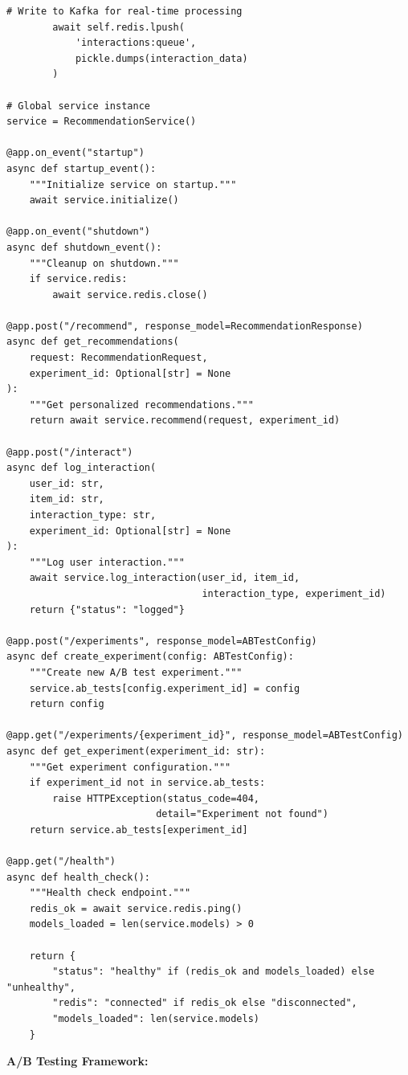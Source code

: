 \begin{lstlisting}[style=python, caption=FastAPI Serving with A/B Testing]
        # Write to Kafka for real-time processing
        await self.redis.lpush(
            'interactions:queue',
            pickle.dumps(interaction_data)
        )

# Global service instance
service = RecommendationService()

@app.on_event("startup")
async def startup_event():
    """Initialize service on startup."""
    await service.initialize()

@app.on_event("shutdown")
async def shutdown_event():
    """Cleanup on shutdown."""
    if service.redis:
        await service.redis.close()

@app.post("/recommend", response_model=RecommendationResponse)
async def get_recommendations(
    request: RecommendationRequest,
    experiment_id: Optional[str] = None
):
    """Get personalized recommendations."""
    return await service.recommend(request, experiment_id)

@app.post("/interact")
async def log_interaction(
    user_id: str,
    item_id: str,
    interaction_type: str,
    experiment_id: Optional[str] = None
):
    """Log user interaction."""
    await service.log_interaction(user_id, item_id,
                                  interaction_type, experiment_id)
    return {"status": "logged"}

@app.post("/experiments", response_model=ABTestConfig)
async def create_experiment(config: ABTestConfig):
    """Create new A/B test experiment."""
    service.ab_tests[config.experiment_id] = config
    return config

@app.get("/experiments/{experiment_id}", response_model=ABTestConfig)
async def get_experiment(experiment_id: str):
    """Get experiment configuration."""
    if experiment_id not in service.ab_tests:
        raise HTTPException(status_code=404,
                          detail="Experiment not found")
    return service.ab_tests[experiment_id]

@app.get("/health")
async def health_check():
    """Health check endpoint."""
    redis_ok = await service.redis.ping()
    models_loaded = len(service.models) > 0

    return {
        "status": "healthy" if (redis_ok and models_loaded) else "unhealthy",
        "redis": "connected" if redis_ok else "disconnected",
        "models_loaded": len(service.models)
    }
\end{lstlisting}

\textbf{A/B Testing Framework:}

